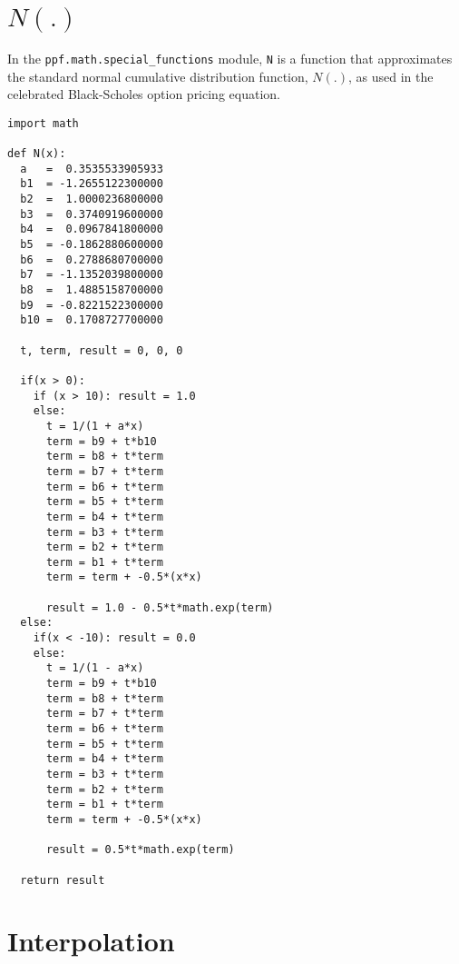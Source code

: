 \section{$N(.)$}
In the \verb|ppf.math.special_functions| module, \verb|N| is a
function that approximates the standard normal cumulative distribution
function, $N(.)$, as used in the celebrated Black-Scholes option
pricing equation.
\begin{verbatim}
import math

def N(x):
  a   =  0.3535533905933
  b1  = -1.2655122300000
  b2  =  1.0000236800000
  b3  =  0.3740919600000
  b4  =  0.0967841800000
  b5  = -0.1862880600000
  b6  =  0.2788680700000
  b7  = -1.1352039800000
  b8  =  1.4885158700000
  b9  = -0.8221522300000
  b10 =  0.1708727700000

  t, term, result = 0, 0, 0
            
  if(x > 0):
    if (x > 10): result = 1.0
    else:
      t = 1/(1 + a*x)
      term = b9 + t*b10
      term = b8 + t*term
      term = b7 + t*term
      term = b6 + t*term
      term = b5 + t*term
      term = b4 + t*term
      term = b3 + t*term
      term = b2 + t*term
      term = b1 + t*term
      term = term + -0.5*(x*x) 

      result = 1.0 - 0.5*t*math.exp(term)
  else:
    if(x < -10): result = 0.0
    else:
      t = 1/(1 - a*x)
      term = b9 + t*b10
      term = b8 + t*term
      term = b7 + t*term
      term = b6 + t*term
      term = b5 + t*term
      term = b4 + t*term
      term = b3 + t*term
      term = b2 + t*term
      term = b1 + t*term
      term = term + -0.5*(x*x)
            
      result = 0.5*t*math.exp(term)
  
  return result
\end{verbatim}

\section{Interpolation}\label{sec:interpolation}

